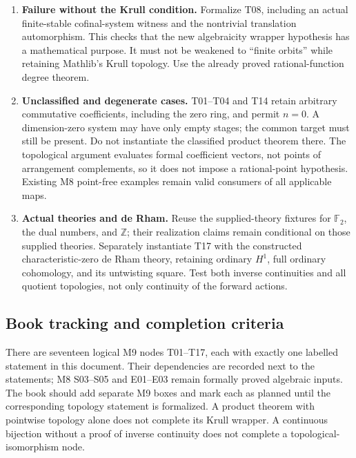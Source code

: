\documentclass[11pt]{article}
\theoremstyle{remark}\newtheorem{remark}[theorem]{Remark}
\newcommand{\F}{\mathbb F}
\newcommand{\Z}{\mathbb Z}
\newcommand{\code}[1]{{\normalfont\nolinkurl{#1}}}
\begin{document}
\begin{enumerate}[leftmargin=*]
distinct: if its $m$th power were identity then every element would
be a root of $X^{p^m}-X$, forcing the algebraic closure to be finite.
An algebraically closed field is infinite, since for a finite field
the polynomial $1+\prod_{a\in k}(X-a)$ has no root. Thus this is a
genuine infinite example. Pin a stage kernel as an open subgroup;
do not accidentally give the whole field automorphism group the
discrete topology through an \code{AlgEquiv} instance.
\item \textbf{Failure without the Krull condition.} Formalize T08,
including an actual finite-stable cofinal-system witness and the
nontrivial translation automorphism. This checks that the new
algebraicity wrapper hypothesis has a mathematical purpose. It must
not be weakened to ``finite orbits'' while retaining Mathlib's Krull
topology. Use the already proved rational-function degree theorem.
\item \textbf{Unclassified and degenerate cases.} T01--T04 and T14
retain arbitrary commutative coefficients, including the zero ring,
and permit $n=0$. A dimension-zero system may have only empty stages;
the common target must still be present. Do not instantiate the
classified product theorem there. The topological argument evaluates
formal coefficient vectors, not points of arrangement complements,
so it does not impose a rational-point hypothesis. Existing M8
point-free examples remain valid consumers of all applicable maps.
\item \textbf{Actual theories and de Rham.} Reuse the supplied-theory
fixtures for $\F_2$, the dual numbers, and $\Z$; their realization
claims remain conditional on those supplied theories. Separately
instantiate T17 with the constructed characteristic-zero de Rham
theory, retaining ordinary $H^1$, full ordinary cohomology, and its
untwisting square. Test both inverse continuities and all quotient
topologies, not only continuity of the forward actions.
\end{enumerate}

\subsection{Book tracking and completion criteria}

There are seventeen logical M9 nodes T01--T17, each with exactly one
labelled statement in this document. Their dependencies are recorded
next to the statements; M8 S03--S05 and E01--E03 remain formally
proved algebraic inputs. The book should add separate M9 boxes and
mark each as planned until the corresponding topology statement is
formalized. A product theorem with pointwise topology alone does not
complete its Krull wrapper. A continuous bijection without a proof of
inverse continuity does not complete a topological-isomorphism node.
\end{document}
